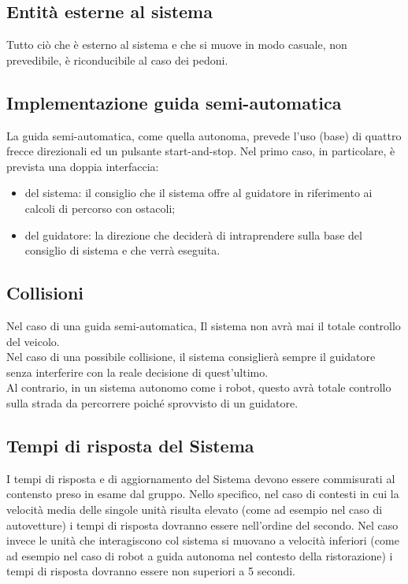 \documentclass[]{article}
\begin{document}
		\subsection{Entità esterne al sistema}
		Tutto ciò che è esterno al sistema e che si muove in modo casuale, non prevedibile, è riconducibile al caso dei pedoni.

		\subsection{Implementazione guida semi-automatica}
		La guida semi-automatica, come quella autonoma, prevede l'uso (base) di quattro frecce direzionali ed un pulsante start-and-stop.
		Nel primo caso, in particolare, è prevista una doppia interfaccia:
		\begin{itemize}
			\item del sistema: il consiglio che il sistema offre al guidatore in riferimento ai calcoli di percorso con ostacoli;
			\item del guidatore: la direzione che deciderà di intraprendere sulla base del consiglio di sistema e che verrà eseguita.
		\end{itemize}


		\subsection{Collisioni}
		Nel caso di una guida semi-automatica, Il sistema non avrà mai il totale controllo del veicolo.\\
		Nel caso di una possibile collisione, il sistema consiglierà sempre il guidatore senza interferire con la reale decisione di quest'ultimo. \\
		Al contrario, in un sistema autonomo come i robot, questo avrà totale controllo sulla strada da percorrere poiché sprovvisto di un guidatore.

		\subsection{Tempi di risposta del Sistema}
		I tempi di risposta e di aggiornamento del Sistema devono essere commisurati al contensto preso in esame dal gruppo. Nello specifico, nel caso di contesti
		in cui la velocità media delle singole unità risulta elevato (come ad esempio nel caso di autovetture) i tempi di risposta dovranno essere nell'ordine del secondo.
		Nel caso invece le unità che interagiscono col sistema si muovano a velocità inferiori (come ad esempio nel caso di robot a guida autonoma nel 
		contesto della ristorazione) i tempi di risposta dovranno essere non superiori a 5 secondi.
\end{document}
